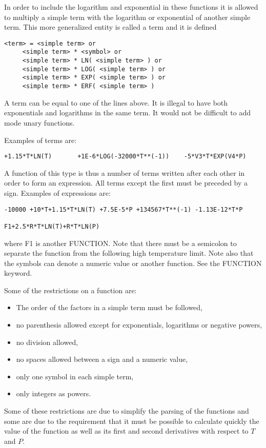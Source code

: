 \documentclass[12pt]{article}
\begin{document}
In order to include the logarithm and exponential in these functions
it is allowed to multiply a simple term with the logarithm or       
exponential of another simple term.  This more generalized entity is 
called a term and it is defined

\begin{verbatim}
<term> = <simple term> or
	 <simple term> * <symbol> or
	 <simple term> * LN( <simple term> ) or
	 <simple term> * LOG( <simple term> ) or
	 <simple term> * EXP( <simple term> ) or
	 <simple term> * ERF( <simple term> )
\end{verbatim}

A term can be equal to one of the lines above.  It is illegal to have
both exponentials and logarithms in the same term.  It would not be
difficult to add mode unary functions.

Examples of terms are:

\begin{verbatim}
+1.15*T*LN(T)       +1E-6*LOG(-32000*T**(-1))    -5*V3*T*EXP(V4*P)
\end{verbatim}

A function of this type is thus a number of terms written after
each other in order to form an expression.  All terms except the first
must be preceded by a sign.  Examples of expressions are:

\begin{verbatim}
-10000 +10*T+1.15*T*LN(T) +7.5E-5*P +134567*T**(-1) -1.13E-12*T*P

F1+2.5*R*T*LN(T)+R*T*LN(P)
\end{verbatim}
where F1 is another FUNCTION.  Note that there must be a semicolon to
separate the function from the following high temperature limit.  Note
also that the symbols can denote a numeric value or another function.
See the FUNCTION keyword.

Some of the restrictions on a function are:                 
\begin{itemize}
\item The order of the factors in a simple term must be followed,
\item no parenthesis allowed except for exponentials, logarithms or
  negative powers,
\item no division allowed,                                             
\item no spaces allowed between a sign and a numeric value,            
\item only one symbol in each simple term,
\item only integers as powers.
\end{itemize}

Some of these restrictions are due to simplify the parsing of the
functions and some are due to the requirement that it must be possible
to calculate quickly the value of the function as well as its first
and second derivatives with respect to $T$ and $P$.
\end{document}
